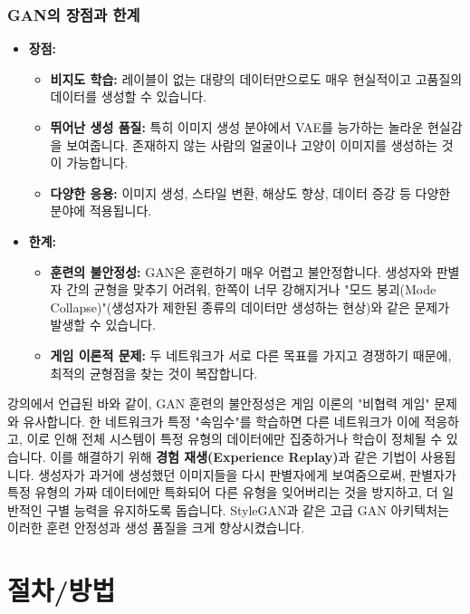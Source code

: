 \documentclass[11pt,a4paper]{article}
\begin{document}
\subsubsection{GAN의 장점과 한계}
\begin{itemize}
    \item \textbf{장점:}
    \begin{itemize}
        \item \textbf{비지도 학습:} 레이블이 없는 대량의 데이터만으로도 매우 현실적이고 고품질의 데이터를 생성할 수 있습니다.
        \item \textbf{뛰어난 생성 품질:} 특히 이미지 생성 분야에서 VAE를 능가하는 놀라운 현실감을 보여줍니다. 존재하지 않는 사람의 얼굴이나 고양이 이미지를 생성하는 것이 가능합니다.
        \item \textbf{다양한 응용:} 이미지 생성, 스타일 변환, 해상도 향상, 데이터 증강 등 다양한 분야에 적용됩니다.
    \end{itemize}
    \item \textbf{한계:}
    \begin{itemize}
        \item \textbf{훈련의 불안정성:} GAN은 훈련하기 매우 어렵고 불안정합니다. 생성자와 판별자 간의 균형을 맞추기 어려워, 한쪽이 너무 강해지거나 "모드 붕괴(Mode Collapse)"(생성자가 제한된 종류의 데이터만 생성하는 현상)와 같은 문제가 발생할 수 있습니다.
        \item \textbf{게임 이론적 문제:} 두 네트워크가 서로 다른 목표를 가지고 경쟁하기 때문에, 최적의 균형점을 찾는 것이 복잡합니다.
    \end{itemize}
\end{itemize}

\begin{tcolorbox}[warningbox, title=GAN 훈련의 불안정성 해결 노력]
강의에서 언급된 바와 같이, GAN 훈련의 불안정성은 게임 이론의 "비협력 게임" 문제와 유사합니다. 한 네트워크가 특정 "속임수"를 학습하면 다른 네트워크가 이에 적응하고, 이로 인해 전체 시스템이 특정 유형의 데이터에만 집중하거나 학습이 정체될 수 있습니다.
이를 해결하기 위해 \textbf{경험 재생(Experience Replay)}과 같은 기법이 사용됩니다. 생성자가 과거에 생성했던 이미지들을 다시 판별자에게 보여줌으로써, 판별자가 특정 유형의 가짜 데이터에만 특화되어 다른 유형을 잊어버리는 것을 방지하고, 더 일반적인 구별 능력을 유지하도록 돕습니다. StyleGAN과 같은 고급 GAN 아키텍처는 이러한 훈련 안정성과 생성 품질을 크게 향상시켰습니다.
\end{tcolorbox}

\newpage
\section*{절차/방법}
\end{document}
